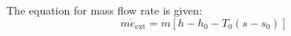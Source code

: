 The equation for mass flow rate is given:  
\[
\dot{m} \dot{e}_{\text{ext}} = \dot{m} \left[ h - h_0 - T_0 (s - s_0) \right]
\]